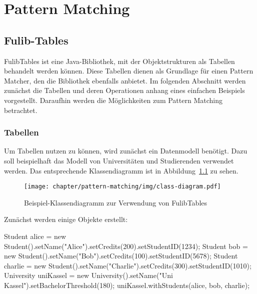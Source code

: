 \chapter{Pattern Matching}\label{ch:pattern-matching}


\section{Fulib-Tables}\label{sec:fulib-tables}

FulibTables\cite{fulibTables} ist eine Java-Bibliothek, mit der Objektstrukturen als Tabellen behandelt werden können.
Diese Tabellen dienen als Grundlage für einen Pattern Matcher, den die Bibliothek ebenfalls anbietet.
Im folgenden Abschnitt werden zunächst die Tabellen und deren Operationen anhang eines einfachen Beispiels vorgestellt.
Daraufhin werden die Möglichkeiten zum Pattern Matching betrachtet.

\subsection{Tabellen}\label{subsec:tables}

Um Tabellen nutzen zu können, wird zunächst ein Datenmodell benötigt.
Dazu soll beispielhaft das Modell von Universitäten und Studierenden verwendet werden.
Das entsprechende Klassendiagramm ist in Abbildung~\ref{fig:table-example-class-diagram} zu sehen.

\begin{figure}
    \texttt{[image: chapter/pattern-matching/img/class-diagram.pdf]}
    \caption{Beispiel-Klassendiagramm zur Verwendung von FulibTables}
    \label{fig:table-example-class-diagram}
\end{figure}

Zunächst werden einige Objekte erstellt:

\begin{jcodeblock}[breaklines]
    Student alice = new Student().setName("Alice").setCredits(200).setStudentID(1234);
    Student bob = new Student().setName("Bob").setCredits(100).setStudentID(5678);
    Student charlie = new Student().setName("Charlie").setCredits(300).setStudentID(1010);
    University uniKassel = new University().setName("Uni Kassel").setBachelorThreshold(180);
    uniKassel.withStudents(alice, bob, charlie);
\end{jcodeblock}

